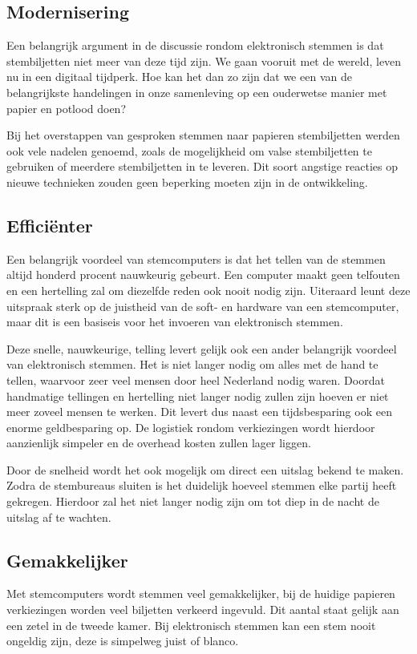 \documentclass[a4paper]{article}
\begin{document}
\subsection{Modernisering}
Een belangrijk argument in de discussie rondom elektronisch stemmen is dat stembiljetten niet meer van deze tijd zijn.
We gaan vooruit met de wereld, leven nu in een digitaal tijdperk.
Hoe kan het dan zo zijn dat we een van de belangrijkste handelingen in onze samenleving op een ouderwetse manier met papier en potlood doen?

Bij het overstappen van gesproken stemmen naar papieren stembiljetten werden ook vele nadelen genoemd, zoals de mogelijkheid om valse stembiljetten te gebruiken of meerdere stembiljetten in te leveren.
Dit soort angstige reacties op nieuwe technieken zouden geen beperking moeten zijn in de ontwikkeling.

\subsection{Effici{\"e}nter}
Een belangrijk voordeel van stemcomputers is dat het tellen van de stemmen altijd honderd procent nauwkeurig gebeurt.
Een computer maakt geen telfouten en een hertelling zal om diezelfde reden ook nooit nodig zijn.
Uiteraard leunt deze uitspraak sterk op de juistheid van de soft- en hardware van een stemcomputer, maar dit is een basiseis voor het invoeren van elektronisch stemmen.

Deze snelle, nauwkeurige, telling levert gelijk ook een ander belangrijk voordeel van elektronisch stemmen.
Het is niet langer nodig om alles met de hand te tellen, waarvoor zeer veel mensen door heel Nederland nodig waren.
Doordat handmatige tellingen en hertelling niet langer nodig zullen zijn hoeven er niet meer zoveel mensen te werken.
Dit levert dus naast een tijdsbesparing ook een enorme geldbesparing op.
De logistiek rondom verkiezingen wordt hierdoor aanzienlijk simpeler en de overhead kosten zullen lager liggen.

Door de snelheid wordt het ook mogelijk om direct een uitslag bekend te maken.
Zodra de stembureaus sluiten is het duidelijk hoeveel stemmen elke partij heeft gekregen.
Hierdoor zal het niet langer nodig zijn om tot diep in de nacht de uitslag af te wachten.

\subsection{Gemakkelijker}
Met stemcomputers wordt stemmen veel gemakkelijker, bij de huidige papieren verkiezingen worden veel biljetten verkeerd ingevuld.
Dit aantal staat gelijk aan een zetel in de tweede kamer.
Bij elektronisch stemmen kan een stem nooit ongeldig zijn, deze is simpelweg juist of blanco.
\end{document}

